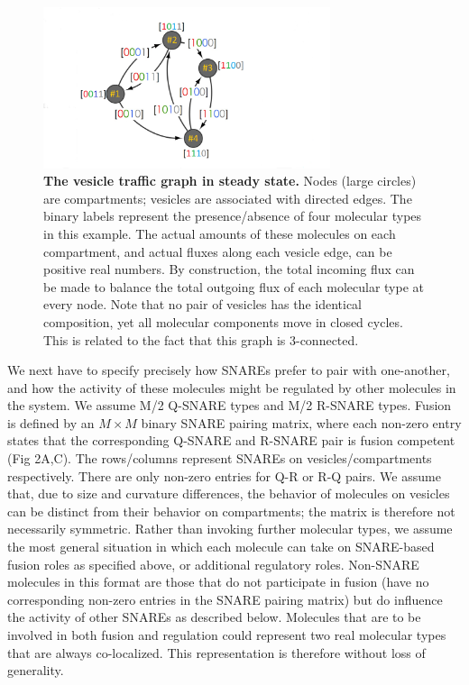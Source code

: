 \documentclass{llncs}
\begin{document}
\begin{figure}[!h]
\centering
\includegraphics[width=0.75\textwidth]{5.png}
\caption{{\bf The vesicle traffic graph in steady state.} Nodes (large circles) are compartments; vesicles are associated with directed edges. The binary labels represent the presence/absence of four molecular types in this example. The actual amounts of these molecules on each compartment, and actual fluxes along each vesicle edge, can be positive real numbers. By construction, the total incoming flux can be made to balance the total outgoing flux of each molecular type at every node. Note that no pair of vesicles has the identical composition, yet all molecular components move in closed cycles. This is related to the fact that this graph is 3-connected.}
\end{figure}

We next have to specify precisely how SNAREs prefer to pair with one-another, and how the activity of these molecules might be regulated by other molecules in the system. We assume M/2 Q-SNARE types and M/2 R-SNARE types. Fusion is defined by an $M\times M$ binary SNARE pairing matrix, where each non-zero entry states that the corresponding Q-SNARE and R-SNARE pair is fusion competent (Fig 2A,C). The rows/columns represent SNAREs on vesicles/compartments respectively. There are only non-zero entries for Q-R or R-Q pairs. We assume that, due to size and curvature differences, the behavior of molecules on vesicles can be distinct from their behavior on compartments; the matrix is therefore not necessarily symmetric. Rather than invoking further molecular types, we assume the most general situation in which each molecule can take on SNARE-based fusion roles as specified above, or additional regulatory roles. Non-SNARE molecules in this format are those that do not participate in fusion (have no corresponding non-zero entries in the SNARE pairing matrix) but do influence the activity of other SNAREs as described below. Molecules that are to be involved in both fusion and regulation could represent two real molecular types that are always co-localized. This representation is therefore without loss of generality. 
\end{document}
